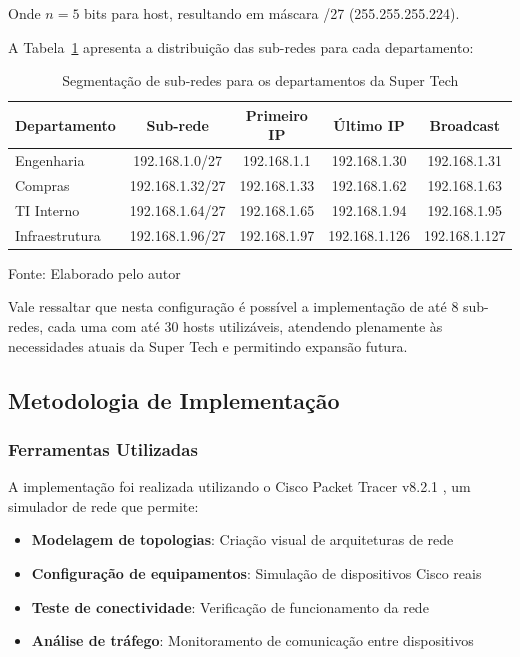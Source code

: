 Onde $n = 5$ bits para host, resultando em máscara /27 (255.255.255.224).

A Tabela~\ref{tab:subredes_supertech} apresenta a distribuição das sub-redes para cada departamento:

\begin{table}[H]
\centering
    \caption{Segmentação de sub-redes para os departamentos da Super Tech}
    \begin{tabular}{|l|c|c|c|c|}
    \hline
    \textbf{Departamento} & \textbf{Sub-rede} & \textbf{Primeiro IP} & \textbf{Último IP} & \textbf{Broadcast} \\
    \hline
    Engenharia & 192.168.1.0/27 & 192.168.1.1 & 192.168.1.30 & 192.168.1.31 \\
    \hline
    Compras & 192.168.1.32/27 & 192.168.1.33 & 192.168.1.62 & 192.168.1.63 \\
    \hline
    TI Interno & 192.168.1.64/27 & 192.168.1.65 & 192.168.1.94 & 192.168.1.95 \\
    \hline
    Infraestrutura & 192.168.1.96/27 & 192.168.1.97 & 192.168.1.126 & 192.168.1.127 \\
    \hline
    \end{tabular}

\label{tab:subredes_supertech}

{\fontsize{10pt}{\baselineskip}\selectfont
Fonte: Elaborado pelo autor}
\end{table}

\par Vale ressaltar que nesta configuração é possível a implementação de até 8 sub-redes, cada uma com até 30 hosts utilizáveis, atendendo plenamente às necessidades atuais da Super Tech e permitindo expansão futura.

\subsection{Metodologia de Implementação}

\subsubsection{Ferramentas Utilizadas}

A implementação foi realizada utilizando o Cisco Packet Tracer v8.2.1 \cite{cisco2023packettracer}, um simulador de rede que permite:

\begin{itemize}
    \item \textbf{Modelagem de topologias}: Criação visual de arquiteturas de rede
    \item \textbf{Configuração de equipamentos}: Simulação de dispositivos Cisco reais
    \item \textbf{Teste de conectividade}: Verificação de funcionamento da rede
    \item \textbf{Análise de tráfego}: Monitoramento de comunicação entre dispositivos
\end{itemize}

